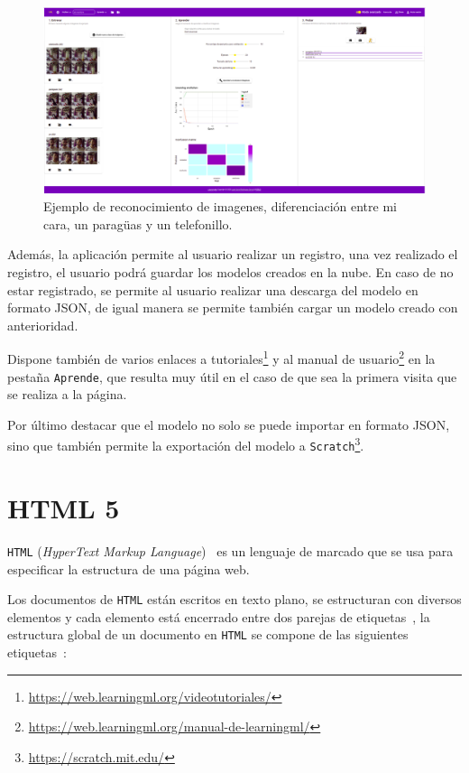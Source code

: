 \documentclass[a4paper, 12pt]{book}
\begin{document}
\begin{figure}
	\centering
	\includegraphics[width=12cm, keepaspectratio]{img/reconocimiento-imagenes.png}
	\caption{Ejemplo de reconocimiento de imagenes, diferenciación entre mi cara, un paragüas y un telefonillo.}\label{fig:reconocimiento-imagenes}
\end{figure}

Además, la aplicación permite al usuario realizar un registro, una vez realizado el registro, el usuario podrá guardar los modelos creados en la nube. En caso de no estar registrado, se permite al usuario realizar una descarga del modelo en formato JSON, de igual manera se permite también cargar un modelo creado con anterioridad.

Dispone también de varios enlaces a tutoriales\footnote{\url{https://web.learningml.org/videotutoriales/}} y al manual de usuario\footnote{\url{https://web.learningml.org/manual-de-learningml/}} en la pestaña \texttt{Aprende}, que resulta muy útil en el caso de que sea la primera visita que se realiza a la página.

Por último destacar que el modelo no solo se puede importar en formato JSON, sino que también permite la exportación del modelo a \texttt{Scratch}\footnote{\url{https://scratch.mit.edu/}}.


\section{HTML 5} 
\label{sec:html5}

\texttt{HTML} (\textit{HyperText Markup Language})~\cite{mdnhtml} es un lenguaje de marcado que se usa para especificar la estructura de una página web.

Los documentos de \texttt{HTML} están escritos en texto plano, se estructuran con diversos elementos y cada elemento está encerrado entre dos parejas de etiquetas~\cite{mdnhtml}, la estructura global de un documento en \texttt{HTML} se compone de las siguientes etiquetas~\cite{gauchat2012gran}:
\end{document}

